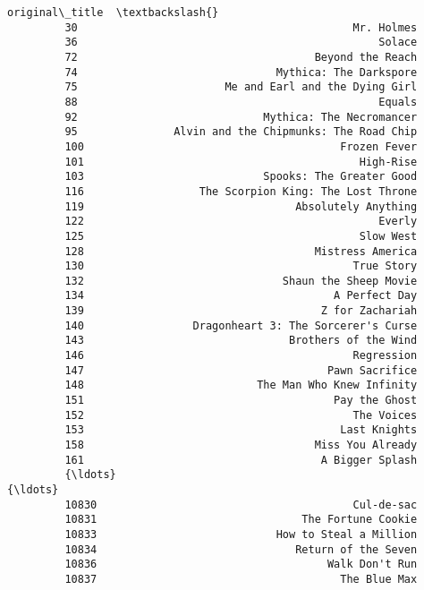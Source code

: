 \documentclass[11pt]{article}
\begin{document}
\begin{Verbatim}[commandchars=\\\{\}]
                                                  original\_title  \textbackslash{}
         30                                           Mr. Holmes   
         36                                               Solace   
         72                                     Beyond the Reach   
         74                               Mythica: The Darkspore   
         75                       Me and Earl and the Dying Girl   
         88                                               Equals   
         92                             Mythica: The Necromancer   
         95               Alvin and the Chipmunks: The Road Chip   
         100                                        Frozen Fever   
         101                                           High-Rise   
         103                            Spooks: The Greater Good   
         116                  The Scorpion King: The Lost Throne   
         119                                 Absolutely Anything   
         122                                              Everly   
         125                                           Slow West   
         128                                    Mistress America   
         130                                          True Story   
         132                               Shaun the Sheep Movie   
         134                                       A Perfect Day   
         139                                     Z for Zachariah   
         140                 Dragonheart 3: The Sorcerer's Curse   
         143                                Brothers of the Wind   
         146                                          Regression   
         147                                      Pawn Sacrifice   
         148                           The Man Who Knew Infinity   
         151                                       Pay the Ghost   
         152                                          The Voices   
         153                                        Last Knights   
         158                                    Miss You Already   
         161                                     A Bigger Splash   
         {\ldots}                                                 {\ldots}   
         10830                                        Cul-de-sac   
         10831                                The Fortune Cookie   
         10833                            How to Steal a Million   
         10834                               Return of the Seven   
         10836                                    Walk Don't Run   
         10837                                      The Blue Max   

\end{Verbatim}
\end{document}

